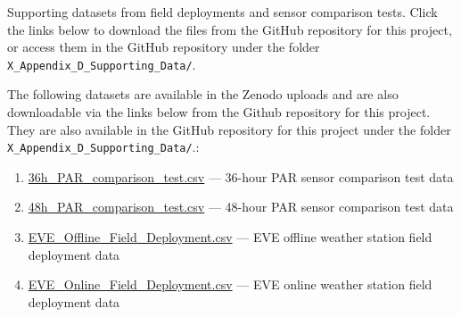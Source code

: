 \documentclass[
  11pt,
  letterpaper,
]{book}
\begin{document}
Supporting datasets from field deployments and sensor comparison tests.
Click the links below to download the files from the GitHub repository
for this project, or access them in the GitHub repository under the
folder \texttt{X\_Appendix\_D\_Supporting\_Data/}.

The following datasets are available in the Zenodo uploads and are also
downloadable via the links below from the Github repository for this
project. They are also available in the GitHub repository for this
project under the folder \texttt{X\_Appendix\_D\_Supporting\_Data/}.:

\begin{enumerate}
\def\labelenumi{\arabic{enumi}.}
\item
  \href{https://github.com/zalf-lli/LCSfFE-handbook/blob/main/X_Appendix_D_Supporting_Data/36h_PAR_comparison_test.csv}{36h\_PAR\_comparison\_test.csv}
  --- 36-hour PAR sensor comparison test data
\item
  \href{https://github.com/zalf-lli/LCSfFE-handbook/blob/main/X_Appendix_D_Supporting_Data/48h_PAR_comparison_test.csv}{48h\_PAR\_comparison\_test.csv}
  --- 48-hour PAR sensor comparison test data
\item
  \href{https://github.com/zalf-lli/LCSfFE-handbook/blob/main/X_Appendix_D_Supporting_Data/EVE_Offline_Field_Deployment.csv}{EVE\_Offline\_Field\_Deployment.csv}
  --- EVE offline weather station field deployment data
\item
  \href{https://github.com/zalf-lli/LCSfFE-handbook/blob/main/X_Appendix_D_Supporting_Data/EVE_Online_Field_Deployment.csv}{EVE\_Online\_Field\_Deployment.csv}
  --- EVE online weather station field deployment data
\end{enumerate}


\backmatter
\end{document}
